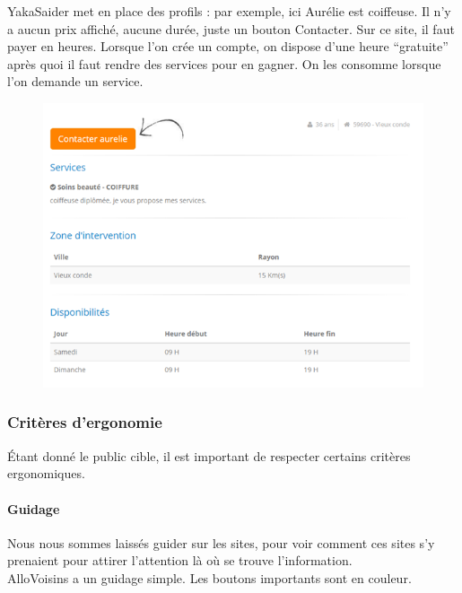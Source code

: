 \documentclass[a4paper,11pt]{article}
\begin{document}
YakaSaider met en place des profils : par exemple, ici Aurélie est coiffeuse. Il n’y a aucun prix affiché,
aucune durée, juste un bouton Contacter. Sur ce site, il faut payer en heures. Lorsque l’on crée un compte,
on dispose d’une heure “gratuite” après quoi il faut rendre des services pour en gagner.
On les consomme lorsque l’on demande un service.\\

\begin{figure}[H]
  \includegraphics[width=500px]{images/aurelie-yakasaider.png}
  \label{fig:aurelie-yakasaider}
\end{figure}

\subsubsection{Critères d'ergonomie}

Étant donné le public cible, il est important de respecter certains critères ergonomiques.\\

\paragraph{Guidage}

Nous nous sommes laissés guider sur les sites, pour voir comment ces sites s’y prenaient pour attirer
l’attention là où se trouve l’information.\\

AlloVoisins a un guidage simple. Les boutons importants sont en couleur.\\
\end{document}
